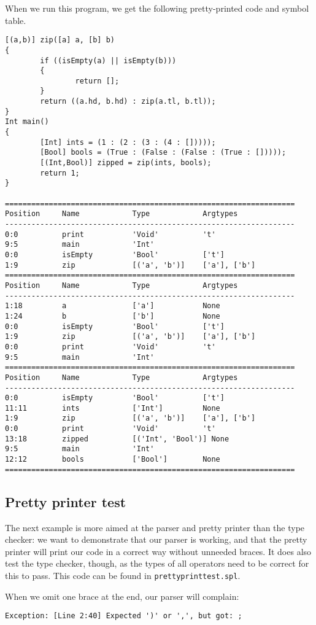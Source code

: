 \documentclass[a4paper]{article}
\begin{document}
When we run this program, we get the following pretty-printed code and symbol table.
\begin{verbatim}
[(a,b)] zip([a] a, [b] b)
{
        if ((isEmpty(a) || isEmpty(b)))
        {
                return [];
        }
        return ((a.hd, b.hd) : zip(a.tl, b.tl));
}
Int main()
{
        [Int] ints = (1 : (2 : (3 : (4 : []))));
        [Bool] bools = (True : (False : (False : (True : []))));
        [(Int,Bool)] zipped = zip(ints, bools);
        return 1;
}

==================================================================
Position     Name            Type            Argtypes            
------------------------------------------------------------------
0:0          print           'Void'          't'                 
9:5          main            'Int'                               
0:0          isEmpty         'Bool'          ['t']               
1:9          zip             [('a', 'b')]    ['a'], ['b']        
==================================================================
Position     Name            Type            Argtypes            
------------------------------------------------------------------
1:18         a               ['a']           None                
1:24         b               ['b']           None                
0:0          isEmpty         'Bool'          ['t']               
1:9          zip             [('a', 'b')]    ['a'], ['b']        
0:0          print           'Void'          't'                 
9:5          main            'Int'                               
==================================================================
Position     Name            Type            Argtypes            
------------------------------------------------------------------
0:0          isEmpty         'Bool'          ['t']               
11:11        ints            ['Int']         None                
1:9          zip             [('a', 'b')]    ['a'], ['b']        
0:0          print           'Void'          't'                 
13:18        zipped          [('Int', 'Bool')] None                
9:5          main            'Int'                               
12:12        bools           ['Bool']        None                
==================================================================
\end{verbatim}

\subsection{Pretty printer test}
The next example is more aimed at the parser and pretty printer than the type checker: we want to demonstrate that our parser is working, and that the pretty printer will print our code in a correct way without unneeded braces. It does also test the type checker, though, as the types of all operators need to be correct for this to pass. This code can be found in {\tt prettyprinttest.spl}.

When we omit one brace at the end, our parser will complain:
\begin{verbatim}
Exception: [Line 2:40] Expected ')' or ',', but got: ;
\end{verbatim}
\end{document}
